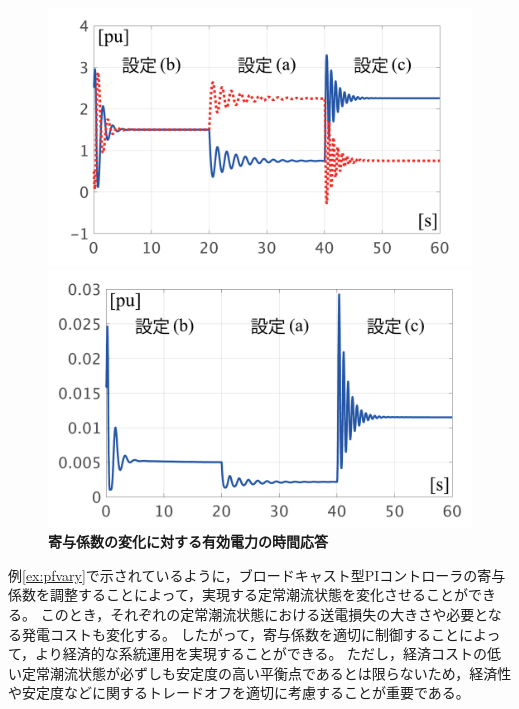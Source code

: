 \documentclass[tombow,dvipdfmx]{corona-a5-1.1}
\begin{document}
\begin{figure}[t]
  \centering
  {
  \begin{minipage}{0.49\linewidth}
    \centering
    \includegraphics[width = 1.0\linewidth]{figs/varyalphaP}
  \end{minipage}
  \begin{minipage}{0.49\linewidth}
    \centering
    \includegraphics[width = 1.0\linewidth]{figs/varyalphaloss}
  \end{minipage}
  \medskip
  \caption{\textbf{寄与係数の変化に対する有効電力の時間応答} }
  \label{fig:agcPvary}
  }
\medskip
\end{figure}


例\ref{ex:pfvary}で示されているように，ブロードキャスト型PIコントローラの寄与係数を調整することによって，実現する定常潮流状態を変化させることができる。
このとき，それぞれの定常潮流状態における送電損失の大きさや必要となる発電コストも変化する。
したがって，寄与係数を適切に制御することによって，より経済的な系統運用を実現することができる。
ただし，経済コストの低い定常潮流状態が必ずしも安定度の高い平衡点であるとは限らないため，経済性や安定度などに関するトレードオフを適切に考慮することが重要である。
\end{document}
